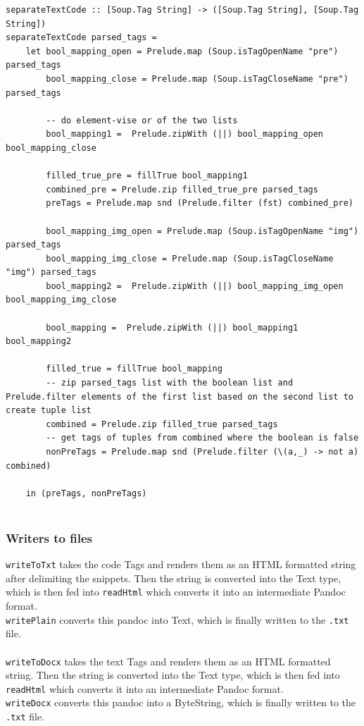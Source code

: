 \documentclass[12pt]{scrreprt}
\begin{document}
\begin{verbatim}
separateTextCode :: [Soup.Tag String] -> ([Soup.Tag String], [Soup.Tag String])
separateTextCode parsed_tags =
    let bool_mapping_open = Prelude.map (Soup.isTagOpenName "pre") parsed_tags
        bool_mapping_close = Prelude.map (Soup.isTagCloseName "pre") parsed_tags

        -- do element-vise or of the two lists
        bool_mapping1 =  Prelude.zipWith (||) bool_mapping_open bool_mapping_close

        filled_true_pre = fillTrue bool_mapping1
        combined_pre = Prelude.zip filled_true_pre parsed_tags
        preTags = Prelude.map snd (Prelude.filter (fst) combined_pre)

        bool_mapping_img_open = Prelude.map (Soup.isTagOpenName "img") parsed_tags
        bool_mapping_img_close = Prelude.map (Soup.isTagCloseName "img") parsed_tags
        bool_mapping2 =  Prelude.zipWith (||) bool_mapping_img_open bool_mapping_img_close

        bool_mapping =  Prelude.zipWith (||) bool_mapping1 bool_mapping2

        filled_true = fillTrue bool_mapping
        -- zip parsed_tags list with the boolean list and Prelude.filter elements of the first list based on the second list to create tuple list
        combined = Prelude.zip filled_true parsed_tags
        -- get tags of tuples from combined where the boolean is false
        nonPreTags = Prelude.map snd (Prelude.filter (\(a,_) -> not a) combined)

    in (preTags, nonPreTags)


\end{verbatim}


\subsubsection{Writers to files}
\texttt{writeToTxt} takes the code Tags and renders them as an HTML formatted string after delimiting the snippets. Then the string is converted into the Text type, which is then fed into \texttt{readHtml} which converts it into an intermediate Pandoc format.\\ \texttt{writePlain} converts this pandoc into Text, which is finally written to the \texttt{.txt} file. \\
\\ \texttt{writeToDocx} takes the text Tags and renders them as an HTML formatted string. Then the string is converted into the Text type, which is then fed into \texttt{readHtml} which converts it into an intermediate Pandoc format.\\ \texttt{writeDocx} converts this pandoc into a ByteString, which is finally written to the \texttt{.txt} file. 
\end{document}
